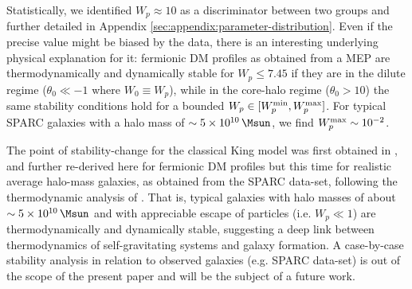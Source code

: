 Statistically, we identified $W_p \approx 10$ as a discriminator between two groups and further detailed in Appendix \ref{sec:appendix:parameter-distribution}. Even if the precise value might be biased by the data, there is an interesting underlying physical explanation for it: fermionic DM profiles as obtained from a MEP are thermodynamically and dynamically stable for $W_p \leq 7.45$ if they are in the dilute regime ($\theta_0 \ll -1$ where $W_0 \equiv W_p$), while in the core-halo regime ($\theta_0 > 10$) the same stability conditions hold for a bounded $W_p \in [W_p^{\rm min}, W_p^{\rm max}]$. For typical SPARC galaxies with a halo mass of $\sim \SI{5E10}{\Msun}$, we find $W_p^{\rm max}\sim \num{E-2}$.


The point of stability-change for the classical King model was first obtained in \cite{2015PhRvD..91f3531C}, and further re-derived here for fermionic DM profiles but this time for realistic average halo-mass galaxies, as obtained from the SPARC data-set, following the thermodynamic analysis of \cite{2021MNRAS.502.4227A}. That is, typical galaxies with halo masses of about $\sim \SI{5E10}{\Msun}$ and with appreciable escape of particles (i.e. $W_p \ll 1$) are thermodynamically and dynamically stable, suggesting a deep link between thermodynamics of self-gravitating systems and galaxy formation. A case-by-case stability analysis in relation to observed galaxies (e.g. SPARC data-set) is out of the scope of the present paper and will be the subject of a future work. 
